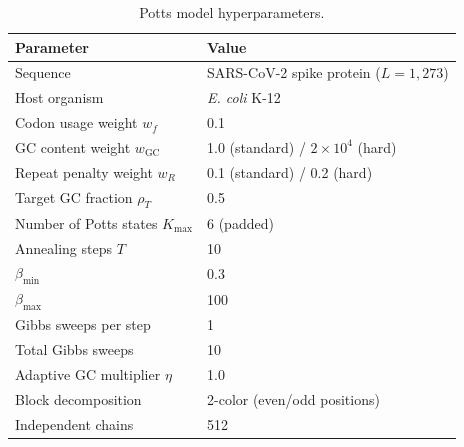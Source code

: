 \documentclass[11pt]{article}
\begin{document}
\begin{table}[H]
\centering
\caption{Potts model hyperparameters.}
\label{tab:potts-params}
\vspace{2mm}
\begin{tabular}{ll}
\toprule
Parameter & Value \\
\midrule
Sequence & SARS-CoV-2 spike protein ($L = 1{,}273$) \\
Host organism & \emph{E. coli} K-12 \\
Codon usage weight $w_f$ & 0.1 \\
GC content weight $w_{\mathrm{GC}}$ & 1.0 (standard) / $2 \times 10^4$ (hard) \\
Repeat penalty weight $w_R$ & 0.1 (standard) / 0.2 (hard) \\
Target GC fraction $\rho_T$ & 0.5 \\
Number of Potts states $K_{\mathrm{max}}$ & 6 (padded) \\
Annealing steps $T$ & 10 \\
$\beta_{\mathrm{min}}$ & 0.3 \\
$\beta_{\mathrm{max}}$ & 100 \\
Gibbs sweeps per step & 1 \\
Total Gibbs sweeps & 10 \\
Adaptive GC multiplier $\eta$ & 1.0 \\
Block decomposition & 2-color (even/odd positions) \\
Independent chains & 512 \\
\bottomrule
\end{tabular}
\end{table}
\end{document}
